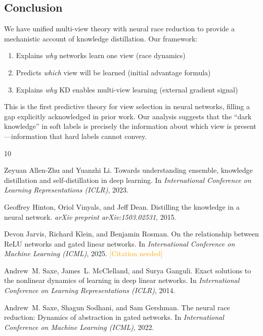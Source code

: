 \documentclass{article}
\newcommand{\citationneeded}{\textcolor{orange}{[Citation needed]}}
\begin{document}
\subsection{Conclusion}

We have unified multi-view theory with neural race reduction to provide a mechanistic account of knowledge distillation. Our framework:

\begin{enumerate}
    \item Explains \emph{why} networks learn one view (race dynamics)
    \item Predicts \emph{which} view will be learned (initial advantage formula)
    \item Explains \emph{why} KD enables multi-view learning (external gradient signal)
\end{enumerate}

This is the first predictive theory for view selection in neural networks, filling a gap explicitly acknowledged in prior work. Our analysis suggests that the ``dark knowledge'' in soft labels is precisely the information about which view is present---information that hard labels cannot convey.



\begin{thebibliography}{10}

Zeyuan Allen-Zhu and Yuanzhi Li.
\newblock Towards understanding ensemble, knowledge distillation and self-distillation in deep learning.
\newblock In \emph{International Conference on Learning Representations (ICLR)}, 2023.

Geoffrey Hinton, Oriol Vinyals, and Jeff Dean.
\newblock Distilling the knowledge in a neural network.
\newblock \emph{arXiv preprint arXiv:1503.02531}, 2015.

Devon Jarvis, Richard Klein, and Benjamin Rosman.
\newblock On the relationship between ReLU networks and gated linear networks.
\newblock In \emph{International Conference on Machine Learning (ICML)}, 2025.
\newblock \citationneeded

Andrew~M. Saxe, James~L. McClelland, and Surya Ganguli.
\newblock Exact solutions to the nonlinear dynamics of learning in deep linear networks.
\newblock In \emph{International Conference on Learning Representations (ICLR)}, 2014.

Andrew~M. Saxe, Shagun Sodhani, and Sam Gershman.
\newblock The neural race reduction: Dynamics of abstraction in gated networks.
\newblock In \emph{International Conference on Machine Learning (ICML)}, 2022.

\end{thebibliography}
\end{document}

